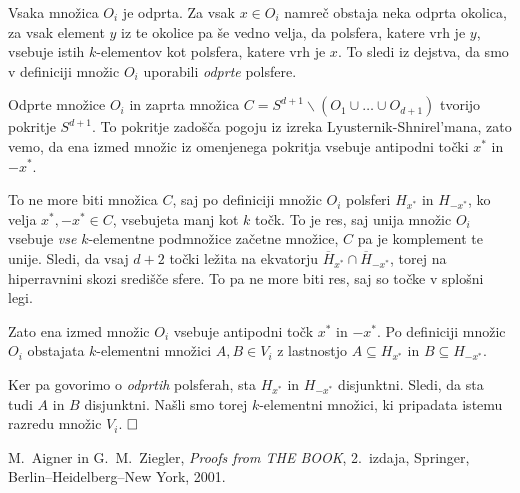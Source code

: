 \documentclass[a4paper,12pt]{article}
\def\qed{$\hfill\Box$}   %
\begin{document}
Vsaka množica $O_i$ je odprta. Za vsak $x \in O_i$ namreč obstaja neka odprta okolica, za vsak element $y$ iz te okolice pa še vedno velja, da polsfera, katere vrh je $y$, vsebuje istih $k$-elementov kot polsfera, katere vrh je $x$. To sledi iz dejstva, da smo v definiciji množic $O_i$ uporabili {\em odprte} polsfere.

Odprte množice $O_i$ in zaprta množica $C = S^{d+1} \backslash (O_1 \cup \ldots \cup O_{d+1})$ tvorijo pokritje $S^{d+1}$. To pokritje zadošča pogoju iz izreka Lyusternik-Shnirel'mana, zato vemo, da ena izmed množic iz omenjenega pokritja vsebuje antipodni točki $x^*$ in $-x^*$. 

To ne more biti množica $C$, saj po definiciji množic $O_i$ polsferi $H_{x^*}$ in $H_{-x^*}$, ko velja $x^*, -x^* \in C$, vsebujeta manj kot $k$ točk. To je res, saj unija množic $O_i$ vsebuje {\em vse} $k$-elementne podmnožice začetne množice, $C$ pa je komplement te unije. Sledi, da vsaj $d+2$ točki ležita na ekvatorju $\overline H_{x^*} \cap \overline H_{-x^*}$, torej na hiperravnini skozi središče sfere. To pa ne more biti res, saj so točke v splošni legi.

Zato ena izmed množic $O_i$ vsebuje antipodni točk $x^*$ in $-x^*$. Po definiciji množic $O_i$  obstajata \mbox{$k$-elementni} množici $A, B \in V_i$ z lastnostjo $A \subseteq H_{x^*}$ in $B \subseteq H_{-x^*}$. 

Ker pa govorimo o {\em odprtih} polsferah, sta $H_{x^*}$ in $H_{-x^*}$ disjunktni. Sledi, da sta tudi $A$ in $B$ disjunktni. Našli smo torej $k$-elementni množici, ki pripadata istemu razredu množic $V_i$. \qed



\begin{thebibliography}{1}

M.~Aigner in G.~M.~Ziegler, \emph{Proofs from THE BOOK}, 2.\ izdaja, Springer, Berlin--Heidelberg--New York, 2001.

\end{thebibliography}
\end{document}
